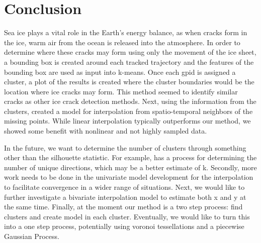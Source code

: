 \documentclass[12pt]{article}
\begin{document}
\hypertarget{conclusion}{%
\section{Conclusion}\label{conclusion}}

Sea ice plays a vital role in the Earth's energy balance, as when cracks
form in the ice, warm air from the ocean is released into the
atmosphere. In order to determine where these cracks may form using only
the movement of the ice sheet, a bounding box is created around each
tracked trajectory and the features of the bounding box are used as
input into k-means. Once each gpid is assigned a cluster, a plot of the
results is created where the cluster boundaries would be the location
where ice cracks may form. This method seemed to identify similar cracks
as other ice crack detection methods. Next, using the information from
the clusters, created a model for interpolation from spatio-temporal
neighbors of the missing points. While linear interpolation typically
outperforms our method, we showed some benefit with nonlinear and not
highly sampled data.

In the future, we want to determine the number of clusters through
something other than the silhouette statistic. For example,
\citet{ossama_extended_2011} has a process for determining the number of
unique directions, which may be a better estimate of k. Secondly, more
work needs to be done in the univariate model development for the
interpolation to facilitate convergence in a wider range of situations.
Next, we would like to further investigate a bivariate interpolation
model to estimate both x and y at the same time. Finally, at the moment
our method is a two step process: find clusters and create model in each
cluster. Eventually, we would like to turn this into a one step process,
potentially using voronoi tessellations and a piecewise Gaussian
Process.



\end{document}
